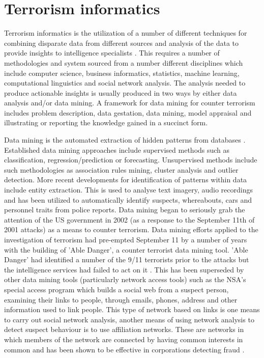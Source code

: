 \section{Terrorism informatics}
Terrorism informatics is the utilization of a number of different techniques for combining disparate data from different sources and analysis of the data to provide insights to intelligence specialists \citep{chau2015intelligence}. This requires a number of methodologies and system sourced from a number different disciplines which include computer science, business informatics, statistics, machine learning, computational linguistics and social network analysis. The analysis needed to produce actionable insights is usually produced in two ways by either data analysis and/or data mining. A framework for data mining for counter terrorism  includes problem description, data gestation, data mining, model appraisal and illustrating or reporting the knowledge gained in a succinct form.

Data mining is the automated extraction of hidden patterns from databases \citep{shmueli2016data}. Established data mining approaches include supervised methods such as  classification, regression/prediction or forecasting. Unsupervised methods include such methodologies as association rules mining, cluster analysis and outlier detection. More recent developments for identification of patterns within data include entity extraction. This is used to analyse text imagery, audio recordings and has been utilized to automatically identify suspects, whereabouts, cars and personnel traits from police reports. Data mining began to seriously grab the attention of the US government in 2002 (as a response to the September 11th of 2001 attacks) as a means to counter terrorism. Data mining efforts applied to the investigation of terrorism had pre-empted September 11 by a number of years with the building of 'Able Danger', a counter terrorist data mining tool. 'Able Danger' \citep{keefe2006can} had identified a number of the 9/11 terrorists prior to the attacks but the intelligence services had failed to act on it \citep{lance2006triple}. This has been superseded by other data mining tools (particularly network access tools) such as the NSA's special access program which builds a social web from a suspect person, examining their links to people, through emails, phones, address and other information used to link people. This type of network based on links is one means to carry out social network analysis, another means of using network analysis to detect suspect behaviour is to use affiliation networks. These are networks  in which members of the network are connected by having common interests in common and has been shown to be effective in corporations detecting fraud \citep{ben2009organised}.

